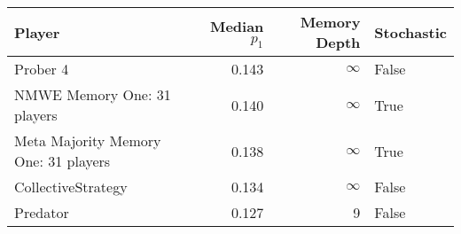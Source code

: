 \begin{tabular}{lrrl}
\toprule
                               Player &  Median $p_1$ &  Memory Depth & Stochastic \\
\midrule
                             Prober 4 &         0.143 &            \(\infty\) &      False \\
          NMWE Memory One: 31 players &         0.140 &            \(\infty\) &       True \\
 Meta Majority Memory One: 31 players &         0.138 &            \(\infty\) &       True \\
                   CollectiveStrategy &         0.134 &            \(\infty\) &      False \\
                             Predator &         0.127 &             9 &      False \\
\bottomrule
\end{tabular}
